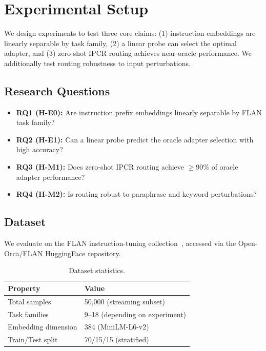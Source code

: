 \section{Experimental Setup}
\label{sec:experiments}

We design experiments to test three core claims: (1) instruction embeddings are linearly separable by task family, (2) a linear probe can select the optimal adapter, and (3) zero-shot IPCR routing achieves near-oracle performance. We additionally test routing robustness to input perturbations.

\subsection{Research Questions}

\begin{itemize}
    \item \textbf{RQ1 (H-E0):} Are instruction prefix embeddings linearly separable by FLAN task family?
    \item \textbf{RQ2 (H-E1):} Can a linear probe predict the oracle adapter selection with high accuracy?
    \item \textbf{RQ3 (H-M1):} Does zero-shot IPCR routing achieve $\geq$90\% of oracle adapter performance?
    \item \textbf{RQ4 (H-M2):} Is routing robust to paraphrase and keyword perturbations?
\end{itemize}

\subsection{Dataset}

We evaluate on the FLAN instruction-tuning collection~\cite{wei2022flan}, accessed via the Open-Orca/FLAN HuggingFace repository.

\begin{table}[h]
\centering
\begin{tabular}{ll}
\toprule
\textbf{Property} & \textbf{Value} \\
\midrule
Total samples & 50,000 (streaming subset) \\
Task families & 9--18 (depending on experiment) \\
Embedding dimension & 384 (MiniLM-L6-v2) \\
Train/Test split & 70/15/15 (stratified) \\
\bottomrule
\end{tabular}
\caption{Dataset statistics.}
\label{tab:dataset}
\end{table}

